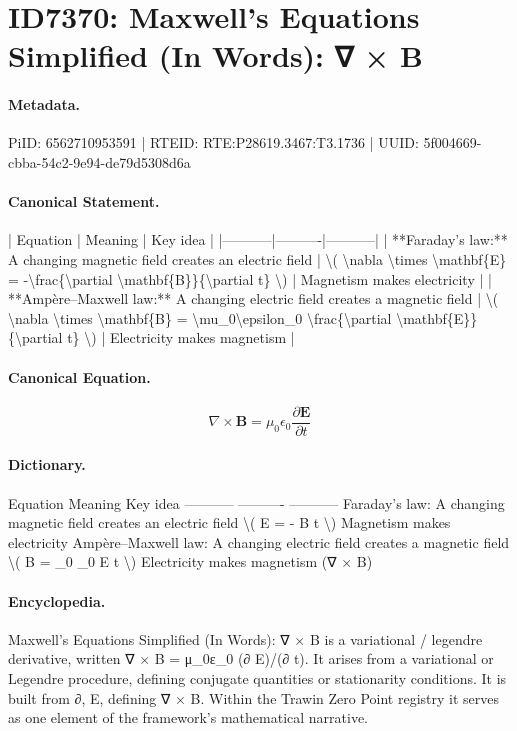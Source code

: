 \section*{ID7370: Maxwell’s Equations Simplified (In Words): ∇ × B}
\paragraph{Metadata.}
PiID: 6562710953591 | RTEID: RTE:P28619.3467:T3.1736 | UUID: 5f004669-cbba-54c2-9e94-de79d5308d6a

\paragraph{Canonical Statement.}
| Equation | Meaning | Key idea | |-----------|----------|-----------| | **Faraday’s law:** A changing magnetic field creates an electric field | \textbackslash{}( \textbackslash{}nabla \textbackslash{}times \textbackslash{}mathbf\{E\} = -\textbackslash{}frac\{\textbackslash{}partial \textbackslash{}mathbf\{B\}\}\{\textbackslash{}partial t\} \textbackslash{}) | Magnetism makes electricity | | **Ampère–Maxwell law:** A changing electric field creates a magnetic field | \textbackslash{}( \textbackslash{}nabla \textbackslash{}times \textbackslash{}mathbf\{B\} = \textbackslash{}mu\_0\textbackslash{}epsilon\_0 \textbackslash{}frac\{\textbackslash{}partial \textbackslash{}mathbf\{E\}\}\{\textbackslash{}partial t\} \textbackslash{}) | Electricity makes magnetism |

\paragraph{Canonical Equation.}
\[
\nabla \times \mathbf{B} = \mu_0\epsilon_0 \frac{\partial \mathbf{E}}{\partial t}
\]

\paragraph{Dictionary.}
Equation Meaning Key idea ----------- ---------- ----------- Faraday’s law: A changing magnetic field creates an electric field \textbackslash{}( E = - B t \textbackslash{}) Magnetism makes electricity Ampère–Maxwell law: A changing electric field creates a magnetic field \textbackslash{}( B = \_0 \_0 E t \textbackslash{}) Electricity makes magnetism (∇ × B)

\paragraph{Encyclopedia.}
Maxwell’s Equations Simplified (In Words): ∇ × B is a variational / legendre derivative, written ∇ × B = μ\_0ε\_0 (∂ E)/(∂ t). It arises from a variational or Legendre procedure, defining conjugate quantities or stationarity conditions. It is built from ∂, E, defining ∇ × B. Within the Trawin Zero Point registry it serves as one element of the framework's mathematical narrative.
